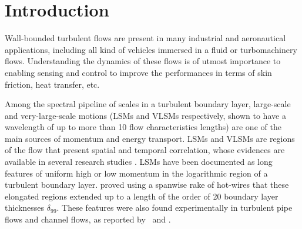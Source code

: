 
% 
%
%
%
%
%
%
%
%




\section{Introduction}

Wall-bounded turbulent flows are present in many industrial and aeronautical applications, including all kind of vehicles immersed in a fluid or turbomachinery flows.
Understanding the dynamics of these flows is of utmost importance to enabling sensing and control to improve the performances in terms of skin friction, heat transfer, etc.

Among the spectral pipeline of scales in a turbulent boundary layer, large-scale and very-large-scale motions (LSMs and VLSMs respectively, shown to have a wavelength of up to more than 10 flow characteristics lengths) are one of the main sources of momentum and energy transport.
LSMs and VLSMs are regions of the flow that present spatial and temporal correlation, whose evidences are available in several research studies \citep{kline1967structure,favre1967structure,blackwelder1972time,wark1991experimental,kim1999very,hutchins2007evidence}.
LSMs have been documented as long features of uniform high or low momentum in the logarithmic region of a turbulent boundary layer.
\citet{hutchins2007evidence} proved using a spanwise rake of hot-wires that these elongated regions extended up to a length of the order of 20 boundary layer thicknesses $\delta_{99}$.
These features were also found experimentally in turbulent pipe flows and channel flows, as reported by \citet{monty2007large} and \citet{discetti2019characterization}.


